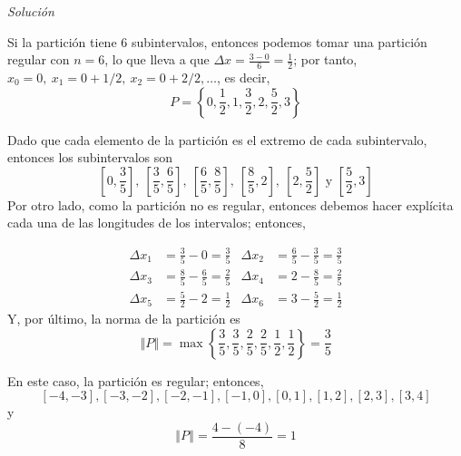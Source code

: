 \emph{Solución}
\begin{parrafonumerado}

\item Si la partición tiene $6$ subintervalos, entonces podemos tomar una partición regular con {\small $n=6$}, lo que lleva a que {\small $\Delta x=\frac{3-0}{6}=\frac{1}{2}$}; por tanto, {\small $x_0=0,\ x_1=0+1/2,\ x_2=0+2/2,\ldots$}, es decir,
\[
P=\left\{ 0,\frac{1}{2},1,\frac{3}{2},2,\frac{5}{2},3\right\}
\]

\item Dado que cada elemento de la partición es el extremo de cada subintervalo, entonces los subintervalos son
\[
\left[ 0,\frac{3}{5}\right],\ \left[ \frac{3}{5},\frac{6}{5}\right],\ \left[ \frac{6}{5},\frac{8}{5}\right],\ \left[ \frac{8}{5},2\right],\ \left[ 2,\frac{5}{2}\right]\text{ y } \left[ \frac{5}{2},3\right]
\]
Por otro lado, como la partición no es regular, entonces debemos hacer explícita cada una de las longitudes de los intervalos; entonces,

\begin{align*}
\Delta x_{1}&=\frac{3}{5}-0=\frac{3}{5} & \Delta x_{2}&=\frac{6}{5}-
\frac{3}{5}=\frac{3}{5}\\[0.5em]
\Delta x_{3}&=\frac{8}{5}-\frac{6}{5}=\frac{2}{5} &\Delta x_{4}&=2-\frac{8}{5}=\frac{2}{5}\\[0.5em]
\Delta x_{5}&=\frac{5}{2}-2=\frac{1}{2}& \Delta x_{6}&=3-\frac{5}{2}=\frac{1}{2}
\end{align*}
Y, por último, la norma de la partición es
\[
\left\Vert P\right\Vert=\max \left\{ \frac{3}{5},\frac{3}{5},\frac{2}{5},%
\frac{2}{5},\frac{1}{2},\frac{1}{2}\right\} =\frac{3}{5}
\]

\item En este caso, la partición es regular; entonces,
\[
\left[ -4,-3\right] ,\left[ -3,-2\right] ,\left[ -2,-1\right] ,\left[ -1,0\right] ,\left[ 0,1\right] ,\left[ 1,2\right] ,\left[ 2,3\right] ,\left[ 3,4\right]
\]
y
\[
\left\Vert P\right\Vert =\frac{4-(-4)}{8}=1
\]


\end{parrafonumerado}
